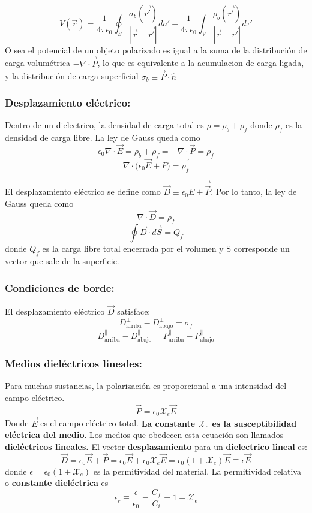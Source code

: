\documentclass[a4paper, 10pt]{article}
\begin{document}
\begin{multicols*}{2}
	$$V(\vec{r}) = \frac{1}{4 \pi \epsilon_0} \oint_S \frac{\sigma_b (\vec{r'})}{|\vec{r}-\vec{r'}|}da' + \frac{1}{4 \pi \epsilon_0} \int_V \frac{\rho_b(\vec{r'})}{|\vec{r}-\vec{r'}|} d \tau '$$
	O sea el potencial de un objeto polarizado es igual a la suma de la distribución de carga volumétrica $-\nabla \cdot \vec{P}$, lo que es equivalente a la acumulacion de carga ligada, y la distribución de carga superficial $\sigma_b \equiv \vec{P} \cdot \hat{n}$
	    
	\subsubsection{Desplazamiento eléctrico:} Dentro de un dielectrico, la densidad de carga total es $\rho = \rho_b + \rho_f$ donde $\rho_f$ es la densidad de carga libre.
	La ley de Gauss queda como 
	$$\epsilon_0 \nabla \cdot \vec{E} = \rho _b + \rho_f = - \nabla \cdot \vec{P} = \rho _f$$
	$$\nabla \cdot (\epsilon_0 \vec{E} + \vec{P) = \rho _f}$$
	    
	El desplazamiento eléctrico se define como $\vec{D} \equiv \epsilon_0 \vec{E + \vec{P}}$. Por lo tanto, la ley de Gauss queda como
	$$\nabla \cdot \vec{D} = \rho_f$$
	$$\oint \vec{D} \cdot d\vec{S}= Q_f$$
	donde $Q_f $ es la carga libre total encerrada por el volumen y S corresponde un vector que sale de la superficie.
	    
	\subsubsection{Condiciones de borde:} El desplazamiento eléctrico $\vec{D}$ satisface:
	$$D_{\text{arriba}}^{\perp} - D_{\text{abajo}}^{\perp}=\sigma _f$$
	$$D_{\text{arriba}}^{\parallel} - D_{\text{abajo}}^{\parallel}=P_{\text{arriba}}^{\parallel} - P_{\text{abajo}}^{\parallel}$$
	    
	\subsubsection{Medios dieléctricos lineales: }Para muchas sustancias, la polarización es proporcional a una intensidad del campo eléctrico.
	$$\vec{P} = \epsilon_0 \mathcal{X}_e \vec{E}$$
	Donde $\vec{E}$ es el campo eléctrico total. \textbf{La constante $\mathcal{X}_e$ es la susceptibilidad eléctrica del medio}.
	Los medios que obedecen esta ecuación son llamados \textbf{dieléctricos lineales.}
	El vector \textbf{desplazamiento} para un \textbf{dielectrico lineal} es:
	$$\vec{D}= \epsilon_0\vec{E}+ \vec{P} = \epsilon_0\vec{E}+ \epsilon_0\mathcal{X}_e\vec{E}= \epsilon_0(1+\mathcal{X}_e)\vec{E}\equiv \epsilon\vec{E}$$
	donde $\epsilon =\epsilon_0(1+\mathcal{X}_e)$ es la permitividad del material.
	La permitividad relativa o \textbf{constante dieléctrica} es
	$$\epsilon_r \equiv \frac{\epsilon}{\epsilon_0}= \frac{C_f}{C_i} = 1 -\mathcal{X}_e$$
	     

\end{multicols*}
\end{document}
